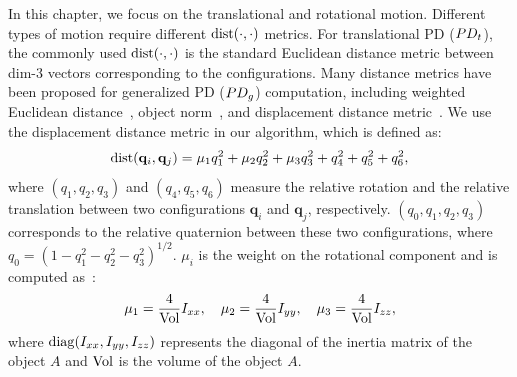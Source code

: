 In this chapter, we focus on the translational and rotational motion. Different types of motion require different $\operatorname{dist}(\cdot,\cdot)$ metrics.
For translational PD ($PD_t$), the commonly used $\operatorname{dist}(\cdot, \cdot)$ is the standard Euclidean distance metric between dim-3 vectors corresponding to the configurations. Many distance metrics have been proposed for generalized PD ($PD_g$) computation, including weighted Euclidean
distance~\cite{Wang:CBO:2012}, object norm~\cite{Je:2012:PRP}, and displacement distance metric~\cite{Zhang:2007:AFP}. We use the displacement distance metric in our algorithm, which is defined as:
\begin{align}
\label{eq:PDgmetric}
\operatorname{dist}(\mathbf q_i, \mathbf q_j) = \mu_1 q_1^2 + \mu_2 q_2^2 + \mu_3 q_3^2 + q_4^2 + q_5^2 + q_6^2,
\end{align}
where $(q_1, q_2, q_3)$ and $(q_4, q_5, q_6)$ measure the relative rotation and the relative translation between two configurations $\mathbf q_i$ and $\mathbf q_j$, respectively. $(q_0, q_1, q_2, q_3)$ corresponds to the relative quaternion between these two configurations, where $q_0=(1- q_1^2-q_2^2-q_3^2)^{1/2}$. $\mu_i$ is the weight on the rotational component and is computed as~\cite{Zhang:2007:AFP}:
\begin{align}
\mu_1 = \frac{4}{\vol}I_{xx}, \ \ \  \mu_2 = \frac{4}{\vol}I_{yy}, \ \ \  \mu_3 = \frac{4}{\vol}I_{zz},
\end{align}
where $\diag(I_{xx}, I_{yy}, I_{zz})$ represents the diagonal of the inertia matrix of the object $A$ and $\operatorname{Vol}$ is the volume of the object $A$. 


